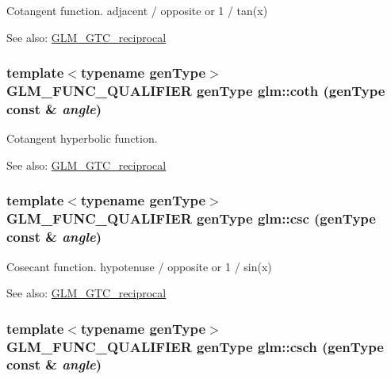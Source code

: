 Cotangent function. adjacent / opposite or 1 / tan(x)

\begin{Desc}
\item[See also:]\hyperlink{group__gtc__reciprocal}{GLM\_\-GTC\_\-reciprocal} \end{Desc}
\hypertarget{group__gtc__reciprocal_g8bc5d51e10b478b061a071eb91258d35}{
\subsubsection[coth]{\setlength{\rightskip}{0pt plus 5cm}template$<$typename genType$>$ GLM\_\-FUNC\_\-QUALIFIER genType glm::coth (genType const \& {\em angle})}}
\label{group__gtc__reciprocal_g8bc5d51e10b478b061a071eb91258d35}


Cotangent hyperbolic function.

\begin{Desc}
\item[See also:]\hyperlink{group__gtc__reciprocal}{GLM\_\-GTC\_\-reciprocal} \end{Desc}
\hypertarget{group__gtc__reciprocal_gdadd7293102fe18951a4acb4df1455a8}{
\subsubsection[csc]{\setlength{\rightskip}{0pt plus 5cm}template$<$typename genType$>$ GLM\_\-FUNC\_\-QUALIFIER genType glm::csc (genType const \& {\em angle})}}
\label{group__gtc__reciprocal_gdadd7293102fe18951a4acb4df1455a8}


Cosecant function. hypotenuse / opposite or 1 / sin(x)

\begin{Desc}
\item[See also:]\hyperlink{group__gtc__reciprocal}{GLM\_\-GTC\_\-reciprocal} \end{Desc}
\hypertarget{group__gtc__reciprocal_g094e1e421d5d9320d4364deb82adb428}{
\subsubsection[csch]{\setlength{\rightskip}{0pt plus 5cm}template$<$typename genType$>$ GLM\_\-FUNC\_\-QUALIFIER genType glm::csch (genType const \& {\em angle})}}
\label{group__gtc__reciprocal_g094e1e421d5d9320d4364deb82adb428}


